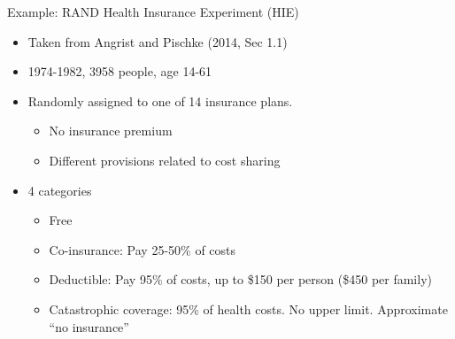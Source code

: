 \documentclass[
  ignorenonframetext,
]{beamer}
\begin{document}
\begin{frame}{Example: RAND Health Insurance Experiment (HIE)}
\protect\hypertarget{example-rand-health-insurance-experiment-hie}{}
\begin{itemize}
\item
  Taken from Angrist and Pischke (2014, Sec 1.1)
\item
  1974-1982, 3958 people, age 14-61
\item
  Randomly assigned to one of 14 insurance plans.

  \begin{itemize}
  \item
    No insurance premium
  \item
    Different provisions related to cost sharing
  \end{itemize}
\item
  4 categories

  \begin{itemize}
  \item
    Free
  \item
    Co-insurance: Pay 25-50\% of costs
  \item
    Deductible: Pay 95\% of costs, up to \$150 per person (\$450 per
    family)
  \item
    Catastrophic coverage: 95\% of health costs. No upper limit.
    Approximate ``no insurance''
  \end{itemize}
\end{itemize}
\end{frame}
\end{document}
